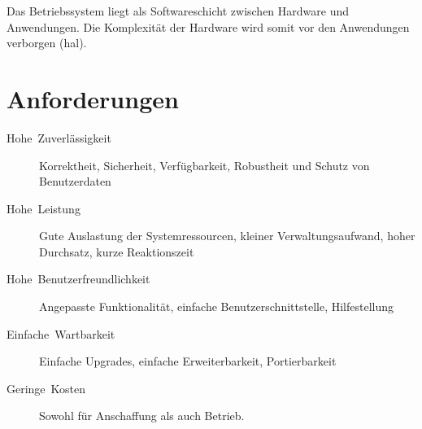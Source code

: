 Das Betriebssystem liegt als Softwareschicht zwischen Hardware und Anwendungen.
Die Komplexität der Hardware wird somit vor den Anwendungen verborgen (\gls{hal}).


\section{Anforderungen}
\begin{description}
  \item [{Hohe~Zuverlässigkeit}]
	Korrektheit, Sicherheit, Verfügbarkeit, Robustheit und Schutz von Benutzerdaten
  \item [{Hohe~Leistung}]
	Gute Auslastung der Systemressourcen, kleiner Verwaltungsaufwand, hoher Durchsatz, kurze Reaktionszeit
  \item [{Hohe~Benutzerfreundlichkeit}]
	Angepasste Funktionalität, einfache Benutzerschnittstelle, Hilfestellung
  \item [{Einfache~Wartbarkeit}]
	Einfache Upgrades, einfache Erweiterbarkeit, Portierbarkeit
  \item [{Geringe~Kosten}]
	Sowohl für Anschaffung als auch Betrieb.
\end{description}


